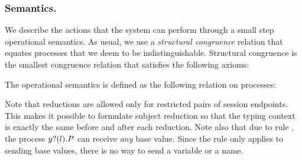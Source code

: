 \documentclass[runningheads]{llncs}
\begin{document}
\subsubsection{Semantics.}
We describe the actions that the system can perform through a small step operational semantics.
As usual, we use  a \emph{structural congruence} relation that equates processes that we deem to be indistinguishable. Structural congruence is the smallest congruence relation that satisfies the following axioms:

The operational semantics is defined as the following relation on processes:

Note that reductions are allowed only for restricted pairs of session endpoints. This makes it possible to formulate subject reduction so that the typing context is exactly the same before and after each reduction.
%
Note also that due to rule , the process \( y ? (l) . P \) can receive \emph{any} base value.
Since the rule  only applies to sending base values, there is no way to send a variable or a name.
\end{document}
